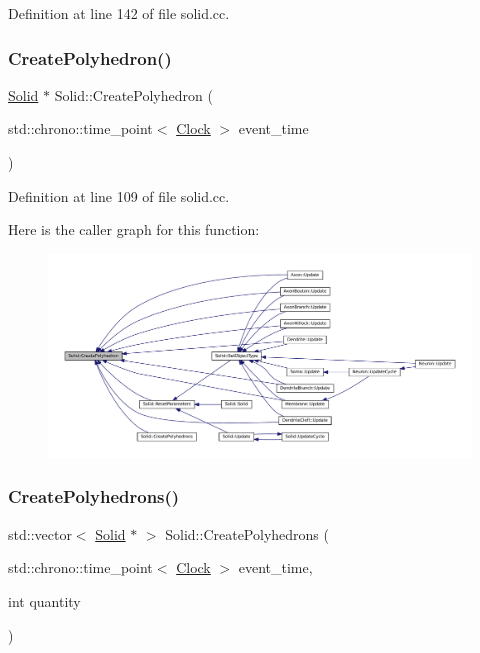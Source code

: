 Definition at line 142 of file solid.\+cc.

\mbox{\label{class_solid_a231b2c469aab60b092fcc3a9525e5c80}} 
\subsubsection{\texorpdfstring{Create\+Polyhedron()}{CreatePolyhedron()}}
{\footnotesize\ttfamily \mbox{\hyperlink{class_solid}{Solid}} $\ast$ Solid\+::\+Create\+Polyhedron (\begin{DoxyParamCaption}\item[{std\+::chrono\+::time\+\_\+point$<$ \mbox{\hyperlink{universe_8h_a0ef8d951d1ca5ab3cfaf7ab4c7a6fd80}{Clock}} $>$}]{event\+\_\+time }\end{DoxyParamCaption})}



Definition at line 109 of file solid.\+cc.

Here is the caller graph for this function\+:\nopagebreak
\begin{figure}[H]
\begin{center}
\leavevmode
\includegraphics[width=350pt]{class_solid_a231b2c469aab60b092fcc3a9525e5c80_icgraph}
\end{center}
\end{figure}
\mbox{\label{class_solid_a40b2ea07e384aff138ba139c3c84f525}} 
\subsubsection{\texorpdfstring{Create\+Polyhedrons()}{CreatePolyhedrons()}}
{\footnotesize\ttfamily std\+::vector$<$ \mbox{\hyperlink{class_solid}{Solid}} $\ast$ $>$ Solid\+::\+Create\+Polyhedrons (\begin{DoxyParamCaption}\item[{std\+::chrono\+::time\+\_\+point$<$ \mbox{\hyperlink{universe_8h_a0ef8d951d1ca5ab3cfaf7ab4c7a6fd80}{Clock}} $>$}]{event\+\_\+time,  }\item[{int}]{quantity }\end{DoxyParamCaption})}



